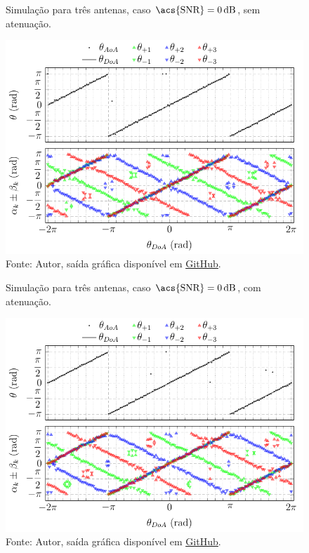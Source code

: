 \begin{figure}[H]
    \centering
    \caption{Simulação para três antenas, caso $\text{\acs{SNR}} = \SI{0}{\deci\bel}$, sem atenuação.}
    \label{fig:simul_POLY_3_R_50_SNR_1}
    \includegraphics{../pictures/simul_POLY_3_R_50_SNR_1.pdf}
    \caption*{Fonte: Autor, saída gráfica disponível em \href{https://github.com/HeckRodSav/TG/blob/main/documentation/pictures/POLY_3/simul_POLY_3_R_50_SNR_1.gif}{\underline{GitHub}}.}
\end{figure}

\begin{figure}[H]
    \centering
    \caption{Simulação para três antenas, caso $\text{\acs{SNR}} = \SI{0}{\deci\bel}$, com atenuação.}
    \label{fig:simul_POLY_3_R_50_SNR_1_ATT}
    \includegraphics{../pictures/simul_POLY_3_R_50_SNR_1_ATT.pdf}
    \caption*{Fonte: Autor, saída gráfica disponível em \href{https://github.com/HeckRodSav/TG/blob/main/documentation/pictures/POLY_3/simul_POLY_3_R_50_SNR_1_ATT.gif}{\underline{GitHub}}.}
\end{figure}

